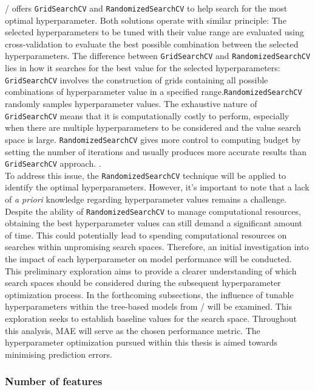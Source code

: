 \scikit/ offers {\tt GridSearchCV} and {\tt RandomizedSearchCV} to help search for the most optimal hyperparameter. Both solutions operate with similar principle: The selected hyperparameters to be tuned with their value range are evaluated using cross-validation to evaluate the best possible combination between the selected hyperparameters. The difference between {\tt GridSearchCV} and {\tt RandomizedSearchCV} lies in how it searches for the best value for the selected hyperparameters: {\tt GridSearchCV} involves the construction of grids containing all possible combinations of hyperparameter value in a specified range.{\tt RandomizedSearchCV} randomly samples hyperparameter values. The exhaustive nature of {\tt GridSearchCV} means that it is computationally costly to perform, especially when there are multiple hyperparameters to be considered and the value search space is large. {\tt RandomizedSearchCV} gives more control to computing budget by setting the number of iterations and usually produces more accurate results than {\tt GridSearchCV} approach. . \\

To address this issue, the {\tt RandomizedSearchCV} technique will be applied to identify the optimal hyperparameters. However, it's important to note that a lack of \emph{a priori} knowledge regarding hyperparameter values remains a challenge. Despite the ability of {\tt RandomizedSearchCV} to manage computational resources, obtaining the best hyperparameter values can still demand a significant amount of time. This could potentially lead to spending computational resources on searches within unpromising search spaces. Therefore, an initial investigation into the impact of each hyperparameter on model performance will be conducted. This preliminary exploration aims to provide a clearer understanding of which search spaces should be considered during the subsequent hyperparameter optimization process. In the forthcoming subsections, the influence of tunable hyperparameters within the tree-based models from \scikit/ will be examined. This exploration seeks to establish baseline values for the search space. Throughout this analysis, MAE will serve as the chosen performance metric. The hyperparameter optimization pursued within this thesis is aimed towards minimising prediction errors.\\

\subsubsection*{Number of features}\label{sec:max_features}

